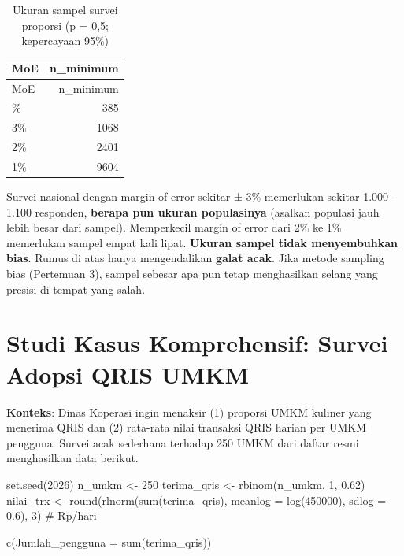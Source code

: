 \documentclass[
  indonesian,
  letterpaper,
]{book}
\newenvironment{Shaded}{\begin{snugshade}}{\end{snugshade}}
\newcommand{\AttributeTok}[1]{\textcolor[rgb]{0.40,0.45,0.13}{#1}}
\newcommand{\CommentTok}[1]{\textcolor[rgb]{0.37,0.37,0.37}{#1}}
\newcommand{\DecValTok}[1]{\textcolor[rgb]{0.68,0.00,0.00}{#1}}
\newcommand{\FloatTok}[1]{\textcolor[rgb]{0.68,0.00,0.00}{#1}}
\newcommand{\FunctionTok}[1]{\textcolor[rgb]{0.28,0.35,0.67}{#1}}
\newcommand{\NormalTok}[1]{\textcolor[rgb]{0.00,0.23,0.31}{#1}}
\newcommand{\OtherTok}[1]{\textcolor[rgb]{0.00,0.23,0.31}{#1}}
\newcommand{\SpecialCharTok}[1]{\textcolor[rgb]{0.37,0.37,0.37}{#1}}
\begin{document}
\begin{longtable}[]{@{}lr@{}}
\caption{Ukuran sampel survei proporsi (p = 0,5; kepercayaan
95\%)}\tabularnewline
\toprule\noalign{}
MoE & n\_minimum \\
\midrule\noalign{}
\endfirsthead
\toprule\noalign{}
MoE & n\_minimum \\
\midrule\noalign{}
\endhead
\bottomrule\noalign{}
\endlastfoot
5\% & 385 \\
3\% & 1068 \\
2\% & 2401 \\
1\% & 9604 \\
\end{longtable}

Survei nasional dengan margin of error sekitar ± 3\% memerlukan sekitar
1.000--1.100 responden, \textbf{berapa pun ukuran populasinya} (asalkan
populasi jauh lebih besar dari sampel). Memperkecil margin of error dari
2\% ke 1\% memerlukan sampel empat kali lipat. \textbf{Ukuran sampel
tidak menyembuhkan bias}. Rumus di atas hanya mengendalikan
\textbf{galat acak}. Jika metode sampling bias (Pertemuan 3), sampel
sebesar apa pun tetap menghasilkan selang yang presisi di tempat yang
salah.


\chapter{Studi Kasus Komprehensif: Survei Adopsi QRIS
UMKM}\label{studi-kasus-komprehensif-survei-adopsi-qris-umkm}

\textbf{Konteks}: Dinas Koperasi ingin menaksir (1) proporsi UMKM
kuliner yang menerima QRIS dan (2) rata-rata nilai transaksi QRIS harian
per UMKM pengguna. Survei acak sederhana terhadap 250 UMKM dari daftar
resmi menghasilkan data berikut.

\begin{Shaded}
\begin{Highlighting}[]
\FunctionTok{set.seed}\NormalTok{(}\DecValTok{2026}\NormalTok{)}
\NormalTok{n\_umkm }\OtherTok{\textless{}{-}} \DecValTok{250}
\NormalTok{terima\_qris }\OtherTok{\textless{}{-}} \FunctionTok{rbinom}\NormalTok{(n\_umkm, }\DecValTok{1}\NormalTok{, }\FloatTok{0.62}\NormalTok{)}
\NormalTok{nilai\_trx }\OtherTok{\textless{}{-}} \FunctionTok{round}\NormalTok{(}\FunctionTok{rlnorm}\NormalTok{(}\FunctionTok{sum}\NormalTok{(terima\_qris), }\AttributeTok{meanlog =} \FunctionTok{log}\NormalTok{(}\DecValTok{450000}\NormalTok{), }\AttributeTok{sdlog =} \FloatTok{0.6}\NormalTok{),}\SpecialCharTok{{-}}\DecValTok{3}\NormalTok{) }\CommentTok{\# Rp/hari}

\FunctionTok{c}\NormalTok{(}\AttributeTok{Jumlah\_pengguna =} \FunctionTok{sum}\NormalTok{(terima\_qris))}
\end{Highlighting}
\end{Shaded}
\end{document}
